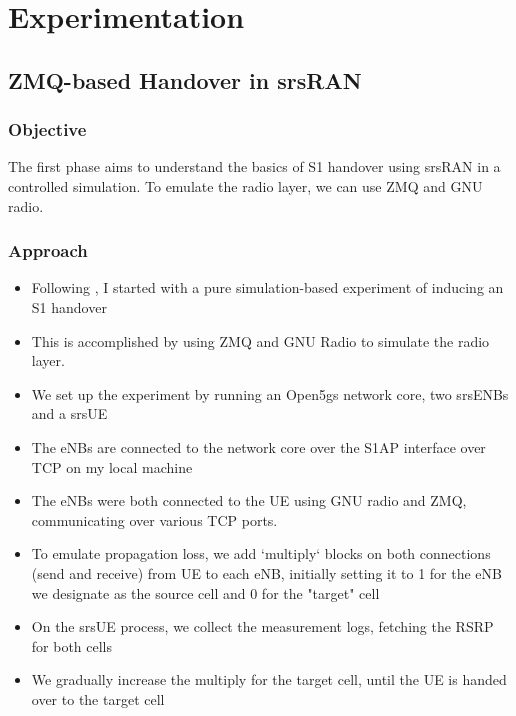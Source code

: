 \chapter{Experimentation}
\section{ZMQ-based Handover in srsRAN}
\subsection{Objective}
The first phase aims to understand the basics of S1 handover using srsRAN in a controlled simulation. To emulate the radio layer, we can use ZMQ and GNU radio.

\subsection{Approach}
\begin{itemize}
    \item Following \cite{powell_handover_2021}, I started with a pure simulation-based experiment of inducing an S1 handover
    \item This is accomplished by using ZMQ and GNU Radio to simulate the radio layer.
    \item We set up the experiment by running an Open5gs network core, two srsENBs and a srsUE
    \item The eNBs are connected to the network core over the S1AP interface over TCP on my local machine
    \item The eNBs were both connected to the UE using GNU radio and ZMQ, communicating over various TCP ports.
    \item To emulate propagation loss, we add `multiply` blocks on both connections (send and receive) from UE to each eNB, initially setting it to 1 for the eNB we designate as the source cell and 0 for the "target" cell 
    \item On the srsUE process, we collect the measurement logs, fetching the RSRP for both cells
    \item We gradually increase the multiply for the target cell, until the UE is handed over to the target cell
\end{itemize}

